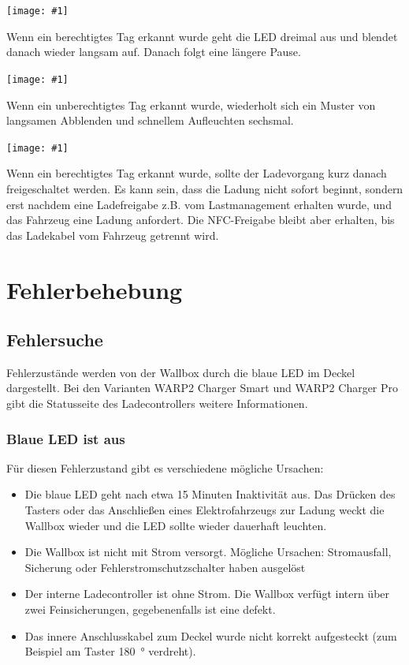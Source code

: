 \documentclass[a4paper,10pt]{article}
\newcommand{\gfx}[1]{\texttt{[image: \#1]}}
\begin{document}
\begin{multicols*}{2}
	\gfx{./img_warp2/resized/blink_nag}

	Wenn ein berechtigtes Tag erkannt wurde geht die LED
	dreimal aus und blendet danach wieder langsam auf. Danach folgt eine längere Pause.

	\gfx{./img_warp2/resized/blink_ack}

	Wenn ein unberechtigtes Tag erkannt wurde, wiederholt sich ein Muster von langsamen Abblenden
	und schnellem Aufleuchten sechsmal.

	\gfx{./img_warp2/resized/blink_nack}

	Wenn ein berechtigtes Tag erkannt wurde, sollte der Ladevorgang kurz danach
	freigeschaltet werden. Es kann sein, dass die Ladung nicht
	sofort beginnt, sondern erst nachdem eine Ladefreigabe z.B. vom Lastmanagement erhalten wurde,
	und das Fahrzeug eine Ladung anfordert. Die NFC-Freigabe bleibt aber erhalten,
	bis das Ladekabel vom Fahrzeug getrennt wird.

	\newpage \section{Fehlerbehebung}\label{fehlerbehebung} \subsection{Fehlersuche}
	Fehlerzustände werden von der Wallbox durch die blaue LED im Deckel
	dargestellt. Bei den Varianten WARP2 Charger Smart und WARP2 Charger Pro gibt die Statusseite des Ladecontrollers
	weitere Informationen.

	\subsubsection*{Blaue LED ist aus}
	Für diesen Fehlerzustand gibt es verschiedene mögliche Ursachen:
	\begin{itemize}
		\item Die blaue LED geht nach etwa 15 Minuten Inaktivität aus. Das Drücken des Tasters
		      oder das Anschließen eines Elektrofahrzeugs zur Ladung weckt die Wallbox wieder
		      und die LED sollte wieder dauerhaft leuchten.
		\item Die Wallbox ist nicht mit Strom versorgt. Mögliche Ursachen: Stromausfall,
		      Sicherung oder Fehlerstrom\-schutzschalter haben ausgelöst
		\item Der interne Ladecontroller ist ohne Strom. Die Wallbox verfügt intern über zwei
		      Feinsicherungen, gegebenenfalls ist eine defekt.
		\item Das innere Anschlusskabel zum Deckel wurde nicht korrekt aufgesteckt (zum Beispiel am Taster \SI{180}{\degree} verdreht).
	\end{itemize}


\end{multicols*}
\end{document}
